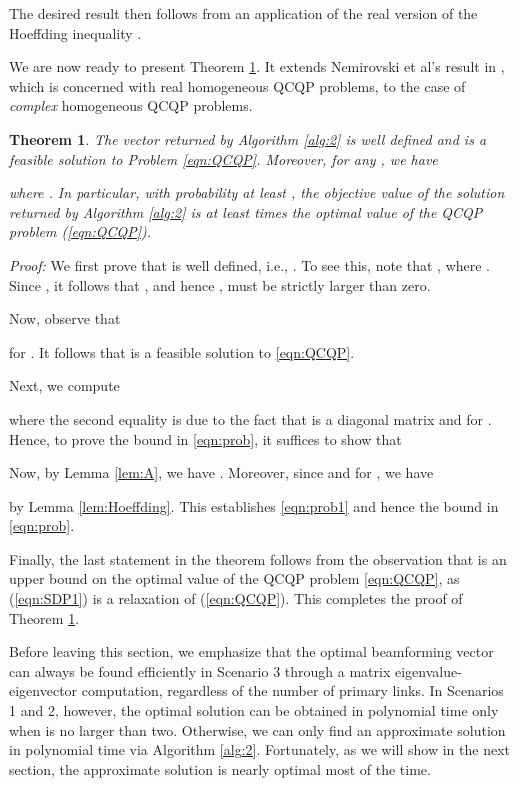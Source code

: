 \documentclass[twocolumn,10pt]{IEEEtran}
\theoremstyle{plain} \newtheorem{theorem}{Theorem}
\theoremstyle{plain} \newtheorem{proposition}{Proposition}
\theoremstyle{plain} \newtheorem{corollary}{Corollary}
\theoremstyle{remark} \newtheorem{remark}{Remark}
\theoremstyle{remark} \newtheorem{lemma}{Lemma}
\theoremstyle{plain} \newtheorem{definition}{Definition}
\theoremstyle{plain} \newtheorem{assumption}{Assumption}
\theoremstyle{plain} \newtheorem{fact}{Fact}
\begin{document}
The desired result then follows from an application of the real version of the Hoeffding inequality \cite{H63}.


We are now ready to present Theorem \ref{thm:random}.  It extends Nemirovski et al's result in \cite{NRT99}, which is concerned with real homogeneous QCQP problems, to the case of \emph{complex} homogeneous QCQP problems.

\begin{theorem}\label{thm:random}
The vector  returned by Algorithm \ref{alg:2} is well defined and is a feasible solution to Problem \eqref{eqn:QCQP}. Moreover, for any , we have

where .  In particular, with probability at least , the objective value of the solution returned by Algorithm \ref{alg:2} is at least  times the optimal value of the QCQP problem (\ref{eqn:QCQP}).
\end{theorem}
\noindent\emph{Proof:} We first prove that  is well defined, i.e., . To see this, note that , where .  Since , it follows that , and hence , must be strictly larger than zero.

Now, observe that

for .  It follows that  is a feasible solution to \eqref{eqn:QCQP}.

Next, we compute

where the second equality is due to the fact that  is a diagonal matrix and  for .  Hence, to prove the bound in \eqref{eqn:prob}, it suffices to show that

Now, by Lemma \ref{lem:A}, we have .  Moreover, since  and  for , we have

by Lemma \ref{lem:Hoeffding}.  This establishes \eqref{eqn:prob1} and hence the bound in \eqref{eqn:prob}.

Finally, the last statement in the theorem follows from the observation that  is an upper bound on the optimal value of the QCQP problem \eqref{eqn:QCQP}, as (\ref{eqn:SDP1}) is a relaxation of (\ref{eqn:QCQP}).  This completes the proof of Theorem \ref{thm:random}.






Before leaving this section, we emphasize that the optimal beamforming vector  can always be found efficiently in Scenario 3 through a matrix eigenvalue-eigenvector computation, regardless of the number of primary links. In Scenarios 1 and 2, however, the optimal solution can be obtained in polynomial time only when  is no larger than two. Otherwise, we can only find an approximate solution in polynomial time via Algorithm \ref{alg:2}. Fortunately, as we will show in the next section, the approximate solution is nearly optimal most of the time.
\end{document}
